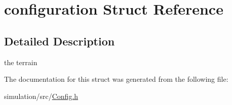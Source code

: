 \hypertarget{structconfiguration}{}\section{configuration Struct Reference}
\label{structconfiguration}


\subsection{Detailed Description}
the terrain 

The documentation for this struct was generated from the following file\+:\begin{DoxyCompactItemize}
\item 
simulation/src/\mbox{\hyperlink{_config_8h}{Config.\+h}}\end{DoxyCompactItemize}
